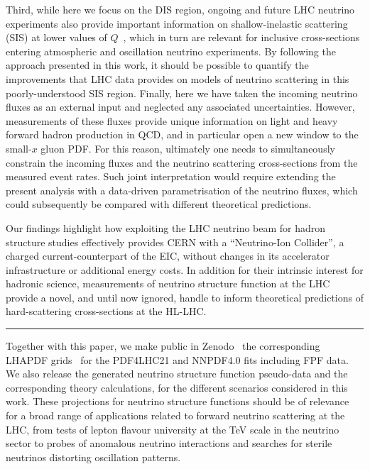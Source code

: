 Third, while here we focus on the DIS
region, ongoing and future LHC neutrino experiments also provide
important information on shallow-inelastic scattering (SIS)
 at lower values of $Q$~\cite{Jeong:2023hwe,Candido:2023utz},
 which in turn are relevant for inclusive cross-sections
entering atmospheric and oscillation neutrino experiments.
%
By following the approach presented in this work, it should be possible to quantify
the improvements that LHC data provides on models
of neutrino scattering in this poorly-understood SIS region.
%
Finally, here we have taken the incoming neutrino fluxes
as an external input and neglected any associated uncertainties.
%
However, measurements of these fluxes provide
unique information on light and heavy forward hadron
production in QCD, and in particular open
a new window to the small-$x$ gluon PDF.
%
For this reason, ultimately one needs to simultaneously constrain 
the incoming fluxes and the neutrino scattering cross-sections
from the measured event rates.
%
Such joint interpretation would require extending the present
analysis with a data-driven parametrisation of the neutrino fluxes,
which could subsequently be compared with different theoretical predictions.

Our findings highlight how exploiting the LHC neutrino beam for hadron structure
studies effectively provides CERN with a ``Neutrino-Ion Collider'', a charged
current-counterpart of the EIC, without  changes in
its accelerator infrastructure or additional energy costs.
%
In addition for their intrinsic interest for hadronic science,
measurements of neutrino structure function at the LHC
provide a novel, and until now ignored, handle to inform theoretical
predictions of hard-scattering cross-sections  at the HL-LHC.

\begin{center}
\rule{5cm}{.1pt}
\end{center}
\bigskip

Together with this paper, we 
make public in Zenodo~\cite{cruz_martinez_juan_2023_8355209}
the corresponding {\sc\small LHAPDF} grids~\cite{Buckley:2014ana}
for the PDF4LHC21 and NNPDF4.0 fits including FPF data.
%
We also release
the generated neutrino structure function pseudo-data
and the corresponding theory
calculations, for the different scenarios considered in this work.
%
These projections for neutrino structure functions
should be of relevance for a broad range of
applications related to forward
neutrino scattering at the LHC, from tests
of lepton flavour university at the TeV scale
in the neutrino sector to probes of anomalous neutrino
interactions and searches for sterile neutrinos
distorting  oscillation patterns.


